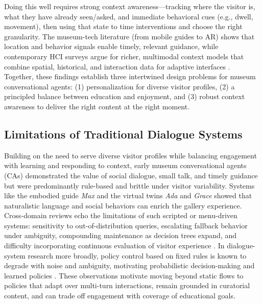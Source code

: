 \documentclass[12pt]{article}
\begin{document}
Doing this well requires strong context awareness—tracking where the visitor is, what they have already seen/asked, and immediate behavioral cues (e.g., dwell, movement), then using that state to time interventions and choose the right granularity. The museum-tech literature (from mobile guides to AR) shows that location and behavior signals enable timely, relevant guidance, while contemporary HCI surveys argue for richer, multimodal context models that combine spatial, historical, and interaction data for adaptive interfaces \citep{raptis-2005-context,wang-2022-museum-AR-survey,hu-2025-context-aware}. Together, these findings establish three intertwined design problems for museum conversational agents: (1) personalization for diverse visitor profiles, (2) a principled balance between education and enjoyment, and (3) robust context awareness to deliver the right content at the right moment.

\subsection{Limitations of Traditional Dialogue Systems}

Building on the need to serve diverse visitor profiles while balancing engagement with learning and responding to context, early museum conversational agents (CAs) demonstrated the value of social dialogue, small talk, and timely guidance but were predominantly rule-based and brittle under visitor variability. Systems like the embodied guide \emph{Max} \citep{kopp2005conversational} and the virtual twins \emph{Ada} and \emph{Grace} \citep{traum2012ada} showed that naturalistic language and social behaviors can enrich the gallery experience. Cross-domain reviews echo the limitations of such scripted or menu-driven systems: sensitivity to out-of-distribution queries, escalating fallback behavior under ambiguity, compounding maintenance as decision trees expand, and difficulty incorporating continuous evaluation of visitor experience \citep{laymouna2024jmir,reimann2024dm}. In dialogue-system research more broadly, policy control based on fixed rules is known to degrade with noise and ambiguity, motivating probabilistic decision-making and learned policies \citep{williams2007pomdp,young2013pomdp}. These observations motivate moving beyond static flows to policies that adapt over multi-turn interactions, remain grounded in curatorial content, and can trade off engagement with coverage of educational goals.\\
\end{document}
